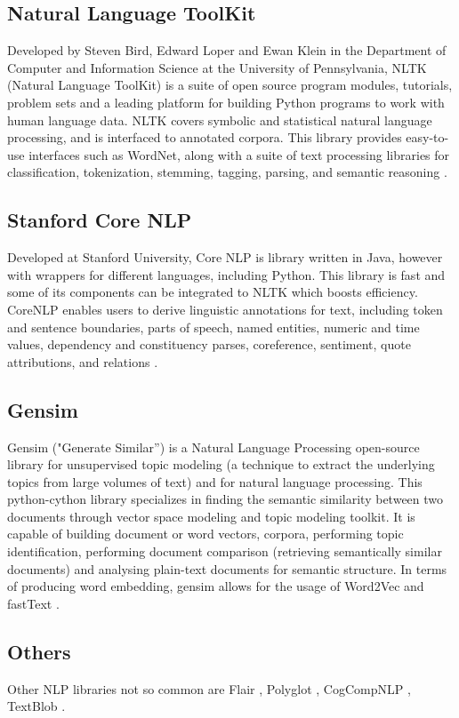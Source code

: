       

        \subsection{Natural Language ToolKit}

        \par Developed by Steven Bird, Edward Loper and Ewan Klein in the Department of Computer and Information Science at the University of Pennsylvania, NLTK (Natural Language ToolKit) is a suite of open source program modules, tutorials, problem sets and a leading platform for building Python programs to work with human language data. NLTK covers symbolic and statistical natural language processing, and is interfaced to annotated corpora. This library provides easy-to-use interfaces such as WordNet, along with a suite of text processing libraries for classification, tokenization, stemming, tagging, parsing, and semantic reasoning \cite{Loper2002}. 

        \subsection{Stanford Core NLP}

        \par Developed at Stanford University, Core NLP is library written in Java, however with wrappers for different languages, including Python. This library is fast and some of its components can be integrated to NLTK which boosts efficiency. CoreNLP enables users to derive linguistic annotations for text, including token and sentence boundaries, parts of speech, named entities, numeric and time values, dependency and constituency parses, coreference, sentiment, quote attributions, and relations \cite{Manning2015}.


        \subsection{Gensim}

        \par Gensim ("Generate Similar”) is a Natural Language Processing open-source library for unsupervised topic modeling (a technique to extract the underlying topics from large volumes of text)  and for natural language processing. This python-cython library specializes in finding the semantic similarity between two documents through vector space modeling and topic modeling toolkit. It is capable of building document or word vectors, corpora, performing topic identification, performing document comparison (retrieving semantically similar documents) and analysing plain-text documents for semantic structure. In terms of producing word embedding, gensim allows for the usage of Word2Vec and fastText \cite{rehurek_lrec}.

        
        \subsection{Others}
        Other NLP libraries not so common are Flair \cite{akbik2018coling}, Polyglot \cite{polyglot:2013:ACL-CoNLL}, CogCompNLP \cite{2018_lrec_cogcompnlp}, TextBlob \cite{textblob}.